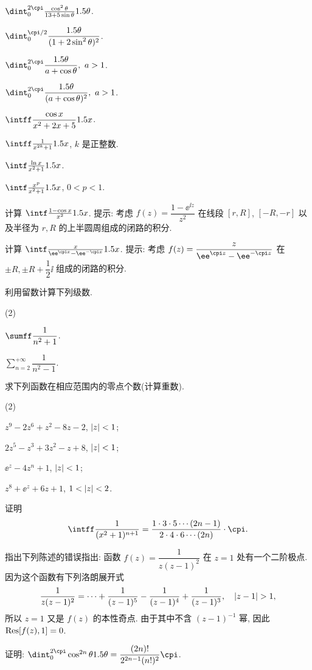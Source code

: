 \begin{homework}
\begin{homework}
\begin{subhomework}
      \item $\dint_0^{2\cpi}\frac{\cos^2\theta}{13+5\sin\theta}\d \theta$.
      \item $\dint_0^{\cpi/2}\dfrac{\d \theta}{(1+2\sin^2\theta)^2}$.
      \item $\dint_0^{2\cpi}\dfrac{\d \theta}{a+\cos\theta},\ a>1$.
      \item $\dint_0^{2\cpi}\dfrac{\d \theta}{(a+\cos\theta)^2},\ a>1$.
      \item $\intff \dfrac{\cos x}{x^2+2x+5}\d x$.
      \item $\intff \frac{1}{x^{2k}+1}\d x$, $k$ 是正整数.
      \item $\intf\frac{\ln x}{x^2+1}\d x$.
      \item $\intf\frac{x^p}{x^2+1}\d x$, $0<p<1$.
    \end{subhomework}
    \item \optionalex 计算 $\intf \frac{1-\cos x}{x^2}\d x$.
    提示: 考虑 $f(z)=\dfrac{1-\ee^{\ii z}}{z^2}$ 在线段 $[r,R]$, $[-R,-r]$ 以及半径为 $r,R$ 的上半圆周组成的闭路的积分.
    \item \optionalex 计算 $\intf \frac{x}{\ee^{\cpi x}-\ee^{-\cpi x}}\d x$.
    提示: 考虑 $f(z)=\dfrac{z}{\ee^{\cpi z}-\ee^{-\cpi z}}$ 在 $\pm R,\pm R+\dfrac12\ii$ 组成的闭路的积分.
    \item \optionalex 利用留数计算下列级数.
    \begin{subhomework}(2)
      \item $\sumff \dfrac1{n^2+1}$.
      \item $\displaystyle\sum_{n=2}^{+\infty} \dfrac1{n^2-1}$.
    \end{subhomework}
    \item \optionalex 求下列函数在相应范围内的零点个数(计算重数).
    \begin{subhomework}(2)
      \item $z^9-2z^6+z^2-8z-2$, $\left|z\right|<1$;
      \item $2z^5-z^3+3z^2-z+8$, $\left|z\right|<1$;
      \item $\ee^z-4z^n+1$, $\left|z\right|<1$;
      \item $z^8+\ee^z+6z+1$, $1<\left|z\right|<2$.
    \end{subhomework}
    \item 证明
    \[
      \intff \frac1{(x^2+1)^{n+1}}
      =\frac{1\cdot 3\cdot 5\cdots(2n-1)}{2\cdot 4\cdot6\cdots(2n)}\cdot \cpi.
    \]
    \item 指出下列陈述的错误指出: 函数 $f(z)=\dfrac1{z(z-1)^2}$ 在 $z=1$ 处有一个二阶极点. 因为这个函数有下列洛朗展开式
      \[
        \frac1{z(z-1)^2}=\cdots+\frac1{(z-1)^5}-\frac1{(z-1)^4}+\frac1{(z-1)^3},\quad\abs{z-1}>1,
      \]
      所以 $z=1$ 又是 $f(z)$ 的本性奇点. 由于其中不含 $(z-1)^{-1}$ 幂, 因此 ${\mathrm{Res}}[f(z),1]=0$.
    \item 证明: $\dint_0^{2\cpi}\cos^{2n}\theta\d \theta=\dfrac{(2n)!}{2^{2n-1}(n!)^2}\cpi$.
  \end{homework}
\end{homework}
\finishwidepage
